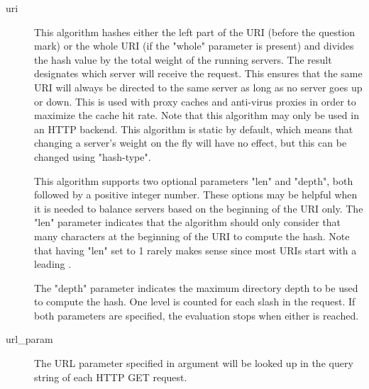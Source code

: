 \begin{description}
      \item[uri]         This algorithm hashes either the left part of the URI (before
                  the question mark) or the whole URI (if the "whole" parameter
                  is present) and divides the hash value by the total weight of
                  the running servers. The result designates which server will
                  receive the request. This ensures that the same URI will
                  always be directed to the same server as long as no server
                  goes up or down. This is used with proxy caches and
                  anti-virus proxies in order to maximize the cache hit rate.
                  Note that this algorithm may only be used in an HTTP backend.
                  This algorithm is static by default, which means that
                  changing a server's weight on the fly will have no effect,
                  but this can be changed using "hash-type".

                  This algorithm supports two optional parameters "len" and
                  "depth", both followed by a positive integer number. These
                  options may be helpful when it is needed to balance servers
                  based on the beginning of the URI only. The "len" parameter
                  indicates that the algorithm should only consider that many
                  characters at the beginning of the URI to compute the hash.
                  Note that having "len" set to 1 rarely makes sense since most
                  URIs start with a leading \chr{/}.

                  The "depth" parameter indicates the maximum directory depth
                  to be used to compute the hash. One level is counted for each
                  slash in the request. If both parameters are specified, the
                  evaluation stops when either is reached.

      \item[url\_param]   The URL parameter specified in argument will be looked up in
                  the query string of each HTTP GET request.


\end{description}
